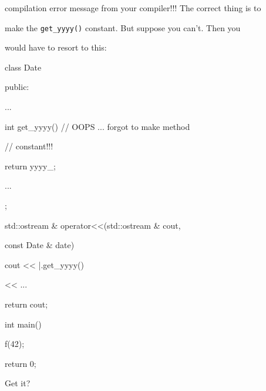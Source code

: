 compilation error message from your compiler!!! The correct thing is to

make the \texttt{get\_yyyy()} constant. But suppose you can't. Then you

would have to resort to this:



\begin{consolethree}[escapeinside=||]

class Date

{

public:

     ...

     int get_yyyy() // OOPS ... forgot to make method

                    // constant!!!

     {    

          return yyyy_;

     }

     ...

};



std::ostream & operator<<(std::ostream & cout,

                          const Date & date)

{    

     cout << |.get\_yyyy()

          << ...

          return cout;

}



int main()

{   

    f(42);

    return 0;

}

\end{consolethree}



Get it?

